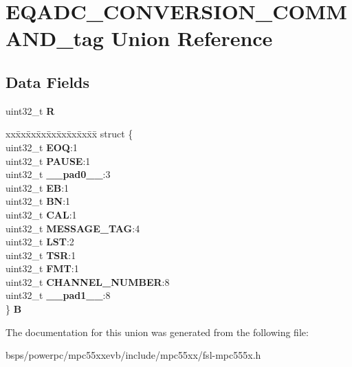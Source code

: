 \hypertarget{unionEQADC__CONVERSION__COMMAND__tag}{}\section{E\+Q\+A\+D\+C\+\_\+\+C\+O\+N\+V\+E\+R\+S\+I\+O\+N\+\_\+\+C\+O\+M\+M\+A\+N\+D\+\_\+tag Union Reference}
\label{unionEQADC__CONVERSION__COMMAND__tag}
\subsection*{Data Fields}
\begin{DoxyCompactItemize}
\item 
\mbox{\label{unionEQADC__CONVERSION__COMMAND__tag_aa1d66b384d9a96cd0afec4f6c1f48847}} 
uint32\+\_\+t {\bfseries R}
\item 
\mbox{\label{unionEQADC__CONVERSION__COMMAND__tag_a0466f1865224c9f9eb34baf804299df0}} 
\begin{tabbing}
xx\=xx\=xx\=xx\=xx\=xx\=xx\=xx\=xx\=\kill
struct \{\\
\>uint32\_t {\bfseries EOQ}:1\\
\>uint32\_t {\bfseries PAUSE}:1\\
\>uint32\_t {\bfseries \_\_pad0\_\_}:3\\
\>uint32\_t {\bfseries EB}:1\\
\>uint32\_t {\bfseries BN}:1\\
\>uint32\_t {\bfseries CAL}:1\\
\>uint32\_t {\bfseries MESSAGE\_TAG}:4\\
\>uint32\_t {\bfseries LST}:2\\
\>uint32\_t {\bfseries TSR}:1\\
\>uint32\_t {\bfseries FMT}:1\\
\>uint32\_t {\bfseries CHANNEL\_NUMBER}:8\\
\>uint32\_t {\bfseries \_\_pad1\_\_}:8\\
\} {\bfseries B}\\

\end{tabbing}\end{DoxyCompactItemize}


The documentation for this union was generated from the following file\+:\begin{DoxyCompactItemize}
\item 
bsps/powerpc/mpc55xxevb/include/mpc55xx/fsl-\/mpc555x.\+h\end{DoxyCompactItemize}
